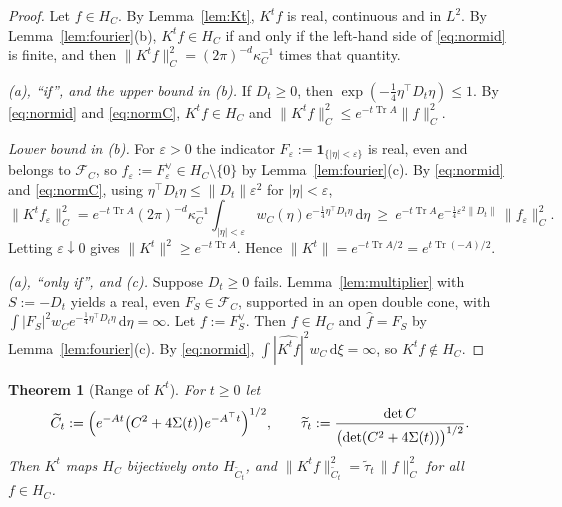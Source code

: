\documentclass[11pt]{article}
\newtheorem{theorem}{Theorem}
\theoremstyle{definition}
\theoremstyle{remark}
\newcommand{\Tr}{\operatorname{Tr}}
\newcommand{\dd}{\,\mathrm{d}}
\newcommand{\FC}[1]{\mathcal{F}_{#1}}
\newcommand{\Ct}{\widetilde{C}_t}
\newcommand{\taut}{\widetilde{\tau}_t}
\newcommand{\hatf}[1]{\widehat{#1}}
\newcommand{\tp}{\top}
\begin{document}
\begin{proof}
Let $f\in H_C$. By Lemma~\ref{lem:Kt}, $K^tf$ is real, continuous and in $L^2$. By
Lemma~\ref{lem:fourier}(b), $K^tf\in H_C$ if and only if the left-hand side of \eqref{eq:normid} is finite, and
then $\|K^tf\|_C^2=(2\pi)^{-d}\kappa_C^{-1}$ times that quantity.

\emph{(a), ``if'', and the upper bound in (b).} If $D_t\ge0$, then $\exp(-\frac14\eta^\tp D_t\eta)\le1$. By
\eqref{eq:normid} and \eqref{eq:normC}, $K^tf\in H_C$ and $\|K^tf\|_C^2\le e^{-t\Tr A}\|f\|_C^2$.

\emph{Lower bound in (b).} For $\varepsilon>0$ the indicator $F_\varepsilon:=\mathbf 1_{\{|\eta|<\varepsilon\}}$ is real,
even and belongs to $\FC{C}$, so $f_\varepsilon:=F_\varepsilon^\vee\in H_C\setminus\{0\}$ by Lemma~\ref{lem:fourier}(c). By
\eqref{eq:normid} and \eqref{eq:normC}, using $\eta^\tp D_t\eta\le\|D_t\|\varepsilon^2$ for $|\eta|<\varepsilon$,
\[
\|K^tf_\varepsilon\|_C^2=e^{-t\Tr A}(2\pi)^{-d}\kappa_C^{-1}\int_{|\eta|<\varepsilon}w_C(\eta)e^{-\frac14\eta^\tp D_t\eta}\dd\eta
\ \ge\ e^{-t\Tr A}e^{-\frac14\varepsilon^2\|D_t\|}\,\|f_\varepsilon\|_C^2 .
\]
Letting $\varepsilon\downarrow0$ gives $\|K^t\|^2\ge e^{-t\Tr A}$. Hence $\|K^t\|=e^{-t\Tr A/2}=e^{t\Tr(-A)/2}$.

\emph{(a), ``only if'', and (c).} Suppose $D_t\ge0$ fails. Lemma~\ref{lem:multiplier} with $S:=-D_t$ yields a real,
even $F_S\in\FC{C}$, supported in an open double cone, with $\int|F_S|^2w_Ce^{-\frac14\eta^\tp D_t\eta}\dd\eta=\infty$.
Let $f:=F_S^\vee$. Then $f\in H_C$ and $\hatf f=F_S$ by Lemma~\ref{lem:fourier}(c). By \eqref{eq:normid},
$\int|\hatf{K^tf}|^2w_C\dd\xi=\infty$, so $K^tf\notin H_C$.
\end{proof}

\begin{theorem}[Range of $K^t$]\label{thm:B}
For $t\ge0$ let
\begin{equation}\label{eq:Ctilde}
\Ct:=\Bigl(e^{-At}\bigl(C^2+4\Sigma(t)\bigr)e^{-A^\tp t}\Bigr)^{1/2},\qquad
\taut:=\frac{\det C}{\bigl(\det(C^2+4\Sigma(t))\bigr)^{1/2}} .
\end{equation}
Then $K^t$ maps $H_C$ bijectively onto $H_{\Ct}$, and $\|K^tf\|_{\Ct}^2=\taut\,\|f\|_C^2$ for all $f\in H_C$.
\end{theorem}
\end{document}
